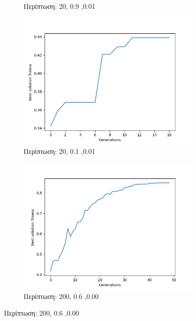 \documentclass[12pt,a4paper]{article}
\begin{document}
\begin{enumerate}
\begin{figure}[H]
\begin{subfigure}[h]{0.7\textwidth}
                         \caption*{Περίπτωση: 20, 0.9 ,0.01}
                     \end{subfigure}
                     \begin{subfigure}[h]{0.7\textwidth}
                         \centering
                         \includegraphics[width=\textwidth]{images/5.png}
                         \caption*{Περίπτωση: 20, 0.1 ,0.01}
                     \end{subfigure}
                     \begin{subfigure}[H]{0.7\textwidth}
                         \centering
                         \includegraphics[width=\textwidth]{images/6.png}
                         \caption*{Περίπτωση: 200, 0.6 ,0.00}

\end{subfigure}
\end{figure}
\end{enumerate}
\end{document}
